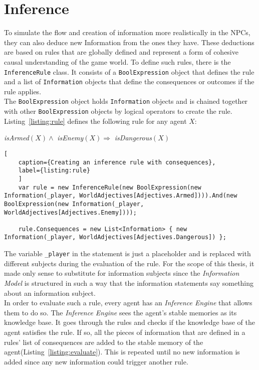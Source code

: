 \section{Inference}
To simulate the flow and creation of information more realistically in the NPCs, they can also deduce new Information from the ones they have. These deductions are based on rules that are globally defined and represent a form of cohesive causal understanding of the game world. To define such rules, there is the \verb|InferenceRule| class. It consists of a \verb|BoolExpression| object that defines the rule and a list of \verb|Information| objects that define the consequences or outcomes if the rule applies.\\
The \verb|BoolExpression| object holds \verb|Information| objects and is chained together with other \verb|BoolExpression| objects by logical operators to create the rule. Listing~\ref{listing:rule} defines the following rule for any agent $X$:
\begin{center}
	\textit{isArmed}$(X) \wedge $ \textit{isEnemy}$(X) \Rightarrow $ \textit{isDangerous}$(X)$ 
\end{center}
\begin{lstlisting}[
	caption={Creating an inference rule with consequences},
	label={listing:rule}
	]
	var rule = new InferenceRule(new BoolExpression(new Information(_player, WorldAdjectives[Adjectives.Armed]))).And(new BoolExpression(new Information(_player, WorldAdjectives[Adjectives.Enemy])));

	rule.Consequences = new List<Information> { new Information(_player, WorldAdjectives[Adjectives.Dangerous]) };
\end{lstlisting}
The variable \verb|_player| in the statement is just a placeholder and is replaced with different subjects during the evaluation of the rule. For the scope of this thesis, it made only sense to substitute for information subjects since the \textit{Information Model} is structured in such a way that the information statements say something about an information subject.\\
In order to evaluate such a rule, every agent has an \textit{Inference Engine} that allows them to do so. The \textit{Inference Engine} sees the agent's stable memories as its knowledge base. It goes through the rules and checks if the knowledge base of the agent satisfies the rule. If so, all the pieces of information that are defined in a rules' list of consequences are added to the stable memory of the agent(Listing~\ref{listing:evaluate}). This is repeated until no new information is added since any new information could trigger another rule.\\
